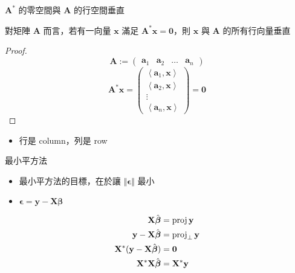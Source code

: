 \documentclass{beamer}
\begin{document}
\begin{CJK}{UTF8}{bsmi}
\begin{frame}{$\mathbf A^*$ 的零空間與 $\mathbf A$ 的行空間垂直}
  \begin{theorem}
    對矩陣 $\mathbf A$ 而言，若有一向量 $\mathbf x$ 滿足 $\mathbf A^* \mathbf x = \mathbf 0$，則 $\mathbf x$ 與 $\mathbf A$
    的所有行向量垂直
  \end{theorem}
  \begin{proof}
    \[\mathbf A := \begin{pmatrix} \mathbf a_1& \mathbf a_2& \dots& \mathbf a_n \end{pmatrix}\]
    \[\mathbf A^* \mathbf x = \begin{pmatrix}
      \left< \mathbf a_1, \mathbf x \right>\\
      \left< \mathbf a_2, \mathbf x \right>\\
      \vdots\\
      \left< \mathbf a_n, \mathbf x \right> \end{pmatrix} = \mathbf 0\]
  \end{proof}
  \begin{itemize}
    \item 行是 column，列是 row
  \end{itemize}
\end{frame}

\begin{frame}{最小平方法}
  \begin{itemize}
    \item 最小平方法的目標，在於讓 $\Vert \boldsymbol\epsilon \Vert$ 最小
    \item $\boldsymbol\epsilon = \mathbf y - \mathbf X \boldsymbol\beta$
  \end{itemize}
  \begin{solution}
    \begin{align*}
      \mathbf X \hat{\boldsymbol\beta} &= \operatorname{proj} \mathbf y\\
      \mathbf y - \mathbf X \hat{\boldsymbol\beta} &= \operatorname{proj}_\bot \mathbf y\\
      \mathbf X^* (\mathbf y - \mathbf X \hat{\boldsymbol\beta}) &= \mathbf 0\\
      \mathbf X^* \mathbf X \hat{\boldsymbol\beta} &= \mathbf X^* \mathbf y\\
    \end{align*}
  \end{solution}
\end{frame}


\end{CJK}
\end{document}
